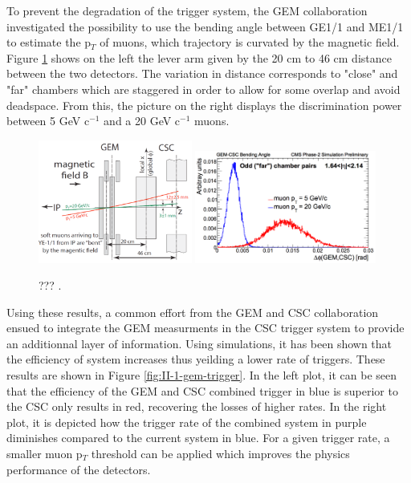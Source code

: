     To prevent the degradation of the trigger system, the GEM collaboration investigated the possibility to use the bending angle between GE1/1 and ME1/1 to estimate the p$_T$ of muons, which trajectory is curvated by the magnetic field. Figure \ref{fig:II-1-gem-csc-bending} shows on the left the lever arm given by the 20 cm to 46 cm distance between the two detectors. The variation in distance corresponds to "close" and "far" chambers which are staggered in order to allow for some overlap and avoid deadspace. From this, the picture on the right displays the discrimination power between 5 GeV c$^{-1}$ and a 20 GeV c$^{-1}$ muons. \\

    \begin{figure}[h!]
      \centering
      \includegraphics[width=0.45\textwidth]{img/II-1-gem/gem-csc-bending-1.png}
      \includegraphics[width=0.53\textwidth]{img/II-1-gem/gem-csc-bending-2.png}
      \caption{??? \cite{Colaleo:2021453}.}
      \label{fig:II-1-gem-csc-bending}
    \end{figure}

    Using these results, a common effort from the GEM and CSC collaboration ensued to integrate the GEM measurments in the CSC trigger system to provide an additionnal layer of information. Using simulations, it has been shown that the efficiency of system increases thus yeilding a lower rate of triggers. These results are shown in Figure \ref{fig:II-1-gem-trigger}. In the left plot, it can be seen that the efficiency of the GEM and CSC combined trigger in blue is superior to the CSC only results in red, recovering the losses of higher rates. In the right plot, it is depicted how the trigger rate of the combined system in purple diminishes compared to the current system in blue. For a given trigger rate, a smaller muon p$_T$ threshold can be applied which improves the physics performance of the detectors. \\ 

